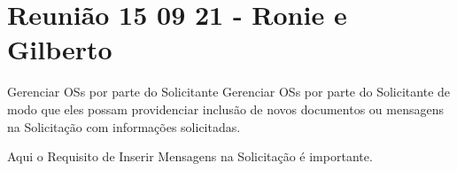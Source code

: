 \section{Reunião 15 09 21 - Ronie e Gilberto}

\begin{funcionalidade}{Gerenciar OSs por parte do Solicitante}
	Gerenciar OSs por parte do Solicitante de modo que eles possam providenciar inclusão de novos documentos ou mensagens na Solicitação com informações solicitadas.
\end{funcionalidade}

Aqui o Requisito de Inserir Mensagens na Solicitação é importante.